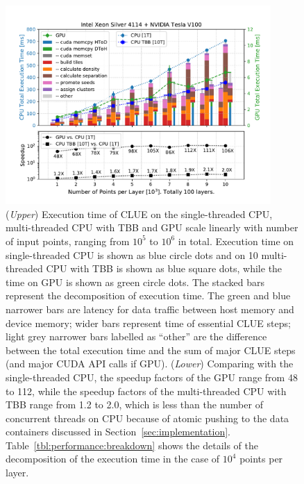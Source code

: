 \begin{figure}[ht!]
    \centering
    \includegraphics[width=0.9\textwidth]{chapters/HGCal/figures/clue/Figure5_patatrack02_1.pdf}
    \caption{ (\emph{Upper}) Execution time of CLUE on the single-threaded CPU, multi-threaded CPU with TBB and GPU scale linearly with number of input points, ranging from $10^5$ to $10^6$ in total. Execution time on single-threaded CPU is shown as blue circle dots and on 10 multi-threaded CPU with TBB is shown as blue square dots, while the time on GPU is shown as green circle dots. The stacked bars represent the decomposition of execution time. The green and blue narrower bars are latency for data traffic between host memory and device memory; wider bars represent time of essential CLUE steps; light grey narrower bars labelled as ``other'' are the difference between the total execution time and the sum of major CLUE steps (and major CUDA API calls if GPU). (\emph{Lower}) Comparing with the single-threaded CPU, the speedup factors of the GPU range from 48 to 112,  while the speedup factors of the multi-threaded CPU with TBB range from 1.2 to 2.0, which is less than the number of concurrent threads on CPU because of atomic pushing to the data containers discussed in Section~\ref{sec:implementation}. Table~\ref{tbl:performance:breakdown} shows the details of the decomposition of the execution time in the case of $10^4$ points per layer. }
    \label{fig:performance:executationTime}
\end{figure}

